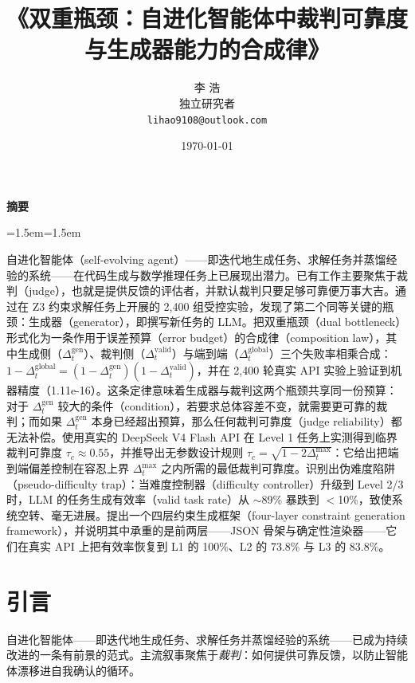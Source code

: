 \documentclass{article}
\title{《双重瓶颈：自进化智能体中裁判可靠度与生成器能力的合成律》}
\author{李 浩\\[2pt]\small 独立研究者\\[2pt]\small \texttt{lihao9108@outlook.com}}
\date{\today}
\newenvironment{摘要}{%
    \par\addvspace{0.8\baselineskip}%
    \begin{center}\large\bfseries 摘要\end{center}%
    \addvspace{0.3\baselineskip}%
    \begingroup\leftskip=1.5em\rightskip=1.5em\noindent\ignorespaces
  }{%
    \par\endgroup\addvspace{0.8\baselineskip}%
  }%
\begin{document}
\maketitle

\begin{摘要}
自进化智能体（self-evolving agent）——即迭代地生成任务、求解任务并蒸馏经验的系统——在代码生成与数学推理任务上已展现出潜力。已有工作主要聚焦于裁判（judge），也就是提供反馈的评估者，并默认裁判只要足够可靠便万事大吉。通过在 Z3 约束求解任务上开展的 2,400 组受控实验，发现了第二个同等关键的瓶颈：生成器（generator），即撰写新任务的 LLM。把双重瓶颈（dual bottleneck）形式化为一条作用于误差预算（error budget）的合成律（composition law），其中生成侧（$\Delta_t^{\mathrm{gen}}$）、裁判侧（$\Delta_t^{\mathrm{valid}}$）与端到端（$\Delta_t^{\mathrm{global}}$）三个失败率相乘合成：$1 - \Delta_t^{\mathrm{global}} = (1 - \Delta_t^{\mathrm{gen}})(1 - \Delta_t^{\mathrm{valid}})$，并在 2,400 轮真实 API 实验上验证到机器精度（1.11e-16）。这条定律意味着生成器与裁判这两个瓶颈共享同一份预算：对于 $\Delta_t^{\mathrm{gen}}$ 较大的条件（condition），若要求总体容差不变，就需要更可靠的裁判；而如果 $\Delta_t^{\mathrm{gen}}$ 本身已经超出预算，那么任何裁判可靠度（judge reliability）都无法补偿。使用真实的 DeepSeek V4 Flash API 在 Level 1 任务上实测得到临界裁判可靠度 $\tau_c \approx 0.55$，并推导出无参数设计规则 $\tau_c = \sqrt{1-2\Delta_t^{\max}}$：它给出把端到端偏差控制在容忍上界 $\Delta_t^{\max}$ 之内所需的最低裁判可靠度。识别出伪难度陷阱（pseudo-difficulty trap）：当难度控制器（difficulty controller）升级到 Level 2/3 时，LLM 的任务生成有效率（valid task rate）从 $\sim$89\% 暴跌到 $<$10\%，致使系统空转、毫无进展。提出一个四层约束生成框架（four-layer constraint generation framework），并说明其中承重的是前两层——JSON 骨架与确定性渲染器——它们在真实 API 上把有效率恢复到 L1 的 100\%、L2 的 73.8\% 与 L3 的 83.8\%。
\end{摘要}

\section{引言}

自进化智能体——即迭代地生成任务、求解任务并蒸馏经验的系统——已成为持续改进的一条有前景的范式。主流叙事聚焦于\textit{裁判}：如何提供可靠反馈，以防止智能体漂移进自我确认的循环。
\end{document}
